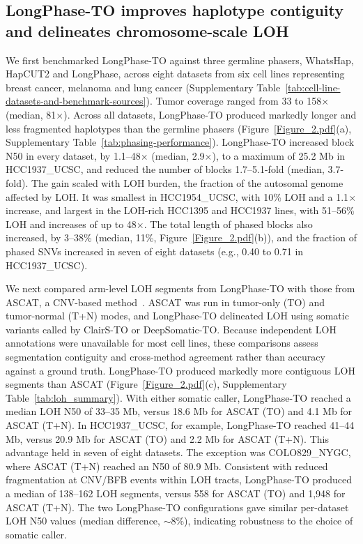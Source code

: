 \documentclass[pdflatex,sn-nature]{sn-jnl}
\begin{document}
\subsection{LongPhase-TO improves haplotype contiguity and delineates chromosome-scale LOH}
We first benchmarked LongPhase-TO against three germline phasers, WhatsHap, HapCUT2 and LongPhase, across eight datasets from six cell lines representing breast cancer, melanoma and lung cancer (Supplementary Table~\ref{tab:cell-line-datasets-and-benchmark-sources}). Tumor coverage ranged from 33 to 158$\times$ (median, 81$\times$). Across all datasets, LongPhase-TO produced markedly longer and less fragmented haplotypes than the germline phasers (Figure~\ref{Figure_2.pdf}(a), Supplementary Table~\ref{tab:phasing-performance}). LongPhase-TO increased block N50 in every dataset, by 1.1--48$\times$ (median, 2.9$\times$), to a maximum of 25.2 Mb in HCC1937\_UCSC, and reduced the number of blocks 1.7--5.1-fold (median, 3.7-fold). The gain scaled with LOH burden, the fraction of the autosomal genome affected by LOH. It was smallest in HCC1954\_UCSC, with 10\% LOH and a 1.1$\times$ increase, and largest in the LOH-rich HCC1395 and HCC1937 lines, with 51--56\% LOH and increases of up to 48$\times$. The total length of phased blocks also increased, by 3--38\% (median, 11\%, Figure~\ref{Figure_2.pdf}(b)), and the fraction of phased SNVs increased in seven of eight datasets (e.g., 0.40 to 0.71 in HCC1937\_UCSC).

We next compared arm-level LOH segments from LongPhase-TO with those from ASCAT, a CNV-based method~\cite{vanloo2010}. ASCAT was run in tumor-only (TO) and tumor-normal (T+N) modes, and LongPhase-TO delineated LOH using somatic variants called by ClairS-TO or DeepSomatic-TO. Because independent LOH annotations were unavailable for most cell lines, these comparisons assess segmentation contiguity and cross-method agreement rather than accuracy against a ground truth. LongPhase-TO produced markedly more contiguous LOH segments than ASCAT (Figure~\ref{Figure_2.pdf}(c), Supplementary Table~\ref{tab:loh_summary}). With either somatic caller, LongPhase-TO reached a median LOH N50 of 33--35 Mb, versus 18.6 Mb for ASCAT (TO) and 4.1 Mb for ASCAT (T+N). In HCC1937\_UCSC, for example, LongPhase-TO reached 41--44 Mb, versus 20.9 Mb for ASCAT (TO) and 2.2 Mb for ASCAT (T+N). This advantage held in seven of eight datasets. The exception was COLO829\_NYGC, where ASCAT (T+N) reached an N50 of 80.9 Mb. Consistent with reduced fragmentation at CNV/BFB events within LOH tracts, LongPhase-TO produced a median of 138--162 LOH segments, versus 558 for ASCAT (TO) and 1,948 for ASCAT (T+N). The two LongPhase-TO configurations gave similar per-dataset LOH N50 values (median difference, $\sim$8\%), indicating robustness to the choice of somatic caller.
\end{document}
